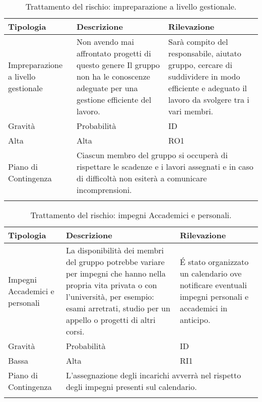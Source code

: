 \begin{center}
	\begin{longtable}{| p{5cm} | p{5cm} | p{5cm} |}
		\hline
		\rowcolor[HTML]{F9CB9C} 
		Tipologia & Descrizione & Rilevazione \\ \hline
		Impreparazione a livello gestionale & Non avendo mai affrontato progetti di questo genere Il gruppo non ha le conoscenze adeguate per una gestione efficiente del lavoro. & Sarà compito del responsabile, aiutato gruppo, cercare di suddividere in modo efficiente e adeguato il lavoro da svolgere tra i vari membri. \\ \hline
		\rowcolor[HTML]{F9CB9C} 
		Gravità & Probabilità & ID  \\ \hline
		Alta & Alta & RO1  \\ \hline
		\cellcolor[HTML]{F9CB9C} Piano di Contingenza & \multicolumn{2}{|p{10cm}|}{Ciascun membro del gruppo si occuperà di rispettare le scadenze e i lavori assegnati e in caso di difficoltà non esiterà a comunicare incomprensioni.} \\ \hline
		\caption{Trattamento del rischio: impreparazione a livello gestionale.}
		\label{fig: Trattamento del rischio: impreparazione a livello gestionale.}
	\end{longtable}
\end{center}

\begin{center}
	\begin{longtable}{| p{5cm} | p{5cm} | p{5cm} |}
		\hline
		\rowcolor[HTML]{F9CB9C} 
		Tipologia & Descrizione & Rilevazione \\ \hline
		Impegni Accademici e personali & La disponibilità dei membri del gruppo potrebbe variare per impegni che hanno nella propria vita privata o con  l'università, per esempio: esami arretrati, studio per un appello o progetti di altri corsi. & É stato organizzato un calendario ove notificare eventuali impegni personali e accademici in anticipo. \\ \hline
		\rowcolor[HTML]{F9CB9C} 
		Gravità & Probabilità & ID  \\ \hline
		Bassa & Alta & RI1  \\ \hline
		\cellcolor[HTML]{F9CB9C} Piano di Contingenza & \multicolumn{2}{|p{10cm}|}{L’assegnazione degli incarichi avverrà nel rispetto degli impegni presenti sul calendario. } \\ \hline
		\caption{Trattamento del rischio: impegni Accademici e personali.}
		\label{fig: Trattamento del rischio: impegni Accademici e personali.}
	\end{longtable}
\end{center}

